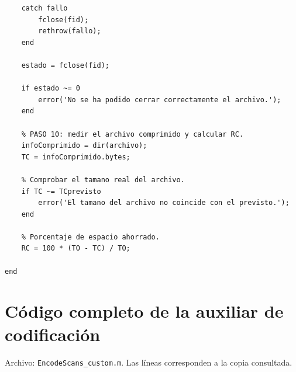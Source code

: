 \documentclass[11pt,a4paper,oneside]{report}
\begin{document}
\begin{lstlisting}
    catch fallo
        fclose(fid);
        rethrow(fallo);
    end

    estado = fclose(fid);

    if estado ~= 0
        error('No se ha podido cerrar correctamente el archivo.');
    end

    % PASO 10: medir el archivo comprimido y calcular RC.
    infoComprimido = dir(archivo);
    TC = infoComprimido.bytes;

    % Comprobar el tamano real del archivo.
    if TC ~= TCprevisto
        error('El tamano del archivo no coincide con el previsto.');
    end

    % Porcentaje de espacio ahorrado.
    RC = 100 * (TO - TC) / TO;

end
\end{lstlisting}

\chapter{Código completo de la auxiliar de codificación}\label{src:EncodeScans_custom.m}

Archivo: \texttt{EncodeScans\_custom.m}. Las líneas corresponden a la copia consultada.
\end{document}
